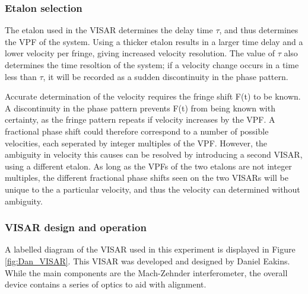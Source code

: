 \subsubsection{Etalon selection}

The etalon used in the VISAR determines the delay time $\tau$, and thus determines the VPF of the system. Using a thicker etalon results in a larger time delay and a lower velocity per fringe, giving increased velocity resolution. The value of $\tau$ also determines the time resoltion of the system; if a velocity change occurs in a time less than $\tau$, it will be recorded as a sudden discontinuity in the phase pattern.

Accurate determination of the velocity requires the fringe shift F(t) to be known. A discontinuity in the phase pattern prevents F(t) from being known with certainty, as the fringe pattern repeats if velocity increases by the VPF. A fractional phase shift could therefore correspond to a number of possible velocities, each seperated by integer multiples of the VPF. However, the ambiguity in velocity this causes can be resolved by introducing a second VISAR, using a different etalon. As long as the VPFs of the two etalons are not integer multiples, the different fractional phase shifts seen on the two VISARs will be unique to the a particular velocity, and thus the velocity can determined without ambiguity.

\subsubsection{VISAR design and operation}

A labelled diagram of the VISAR used in this experiment is displayed in Figure \ref{fig:Dan_VISAR}. This VISAR was developed and designed by Daniel Eakins. While the main components are the Mach-Zehnder interferometer, the overall device contains a series of optics to aid with alignment.

